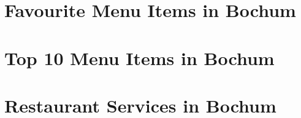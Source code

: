 \begin{appendices}
\section{Favourite Menu Items in Bochum}
\label{app:fav_items}

\section{Top 10 Menu Items in Bochum}
\label{app:items}

\section{Restaurant Services in Bochum}
\label{app:items}

\end{appendices}
